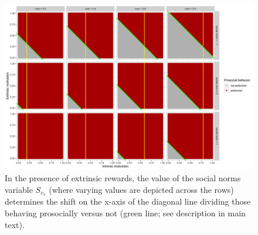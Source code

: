 \documentclass[AER]{AEA}
\begin{document}









\begin{figure}[b!]
    \centering
    \includegraphics[width=\textwidth]{images/total_benefit_SOC.png}
    \caption{In the presence of extrinsic rewards, the value of the social norms variable $S_{v_{v}}$ (where varying values are depicted across the rows) determines the shift on the x-axis of the diagonal line dividing those behaving prosocially versus not (green line; see description in main text).}
    \label{fig:model_SOC}
\end{figure}
\end{document}
